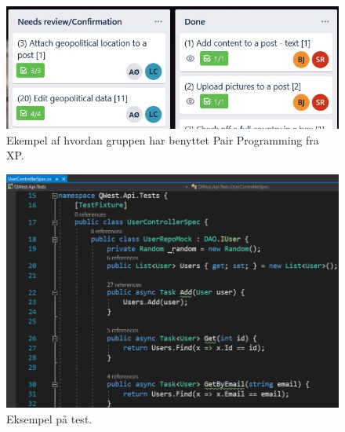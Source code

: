 \begin{figure}
    \includegraphics[width=\linewidth]{figures/pairprogramming.jpg}
    \caption{Ekempel af hvordan gruppen har benyttet Pair Programming fra XP.}
    \label{fig:Pair}
\end{figure}


\begin{figure}
    \includegraphics[width=\linewidth]{figures/tests.png}
    \caption{Eksempel på test.}
    \label{fig:Test}
\end{figure}


